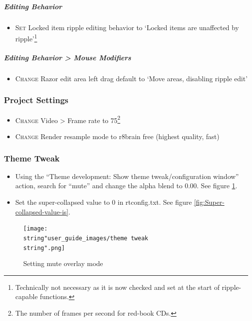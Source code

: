 \documentclass[10pt,american]{article}
\begin{document}
\subparagraph{Editing Behavior}
\begin{itemize}
\item \textsc{Set }Locked item ripple editing behavior to `Locked items are
unaffected by ripple'\footnote{Technically not necessary as it is now checked
and set at the start of ripple-capable functions.}
\end{itemize}

\subparagraph{Editing Behavior > Mouse Modifiers}
\begin{itemize}
\item \textsc{Change }Razor edit area left drag default to `Move areas,
disabling ripple edit'
\end{itemize}

\subsubsection{Project Settings }
\begin{itemize}
\item \begin{flushleft} \textsc{Change} Video > Frame rate to 75\footnote{The
number of frames per second for red-book CDs.} \par\end{flushleft}
\item \begin{flushleft} \textsc{Change} Render resample mode to r8brain free
(highest quality, fast) \par\end{flushleft}
\end{itemize}

\subsubsection{Theme Tweak}
\begin{itemize}
\item \begin{flushleft} Using the ``Theme development: Show theme
tweak/configuration window'' action, search for ``mute'' and change the alpha
blend to 0.00. See figure \ref{Setting-mute-overlay}. \par\end{flushleft}
\item Set the super-collapsed value to 0 in rtconfig.txt. See figure
\ref{fig:Super-collapsed-value-is}.
\end{itemize}
\begin{flushleft}
\begin{figure}
\begin{centering}
\texttt{[image: \\string"user\_guide\_images/theme tweak\\string".png]}
\par\end{centering} \caption{\label{Setting-mute-overlay}Setting mute overlay
mode}
\end{figure}
\par\end{flushleft}
\end{document}

